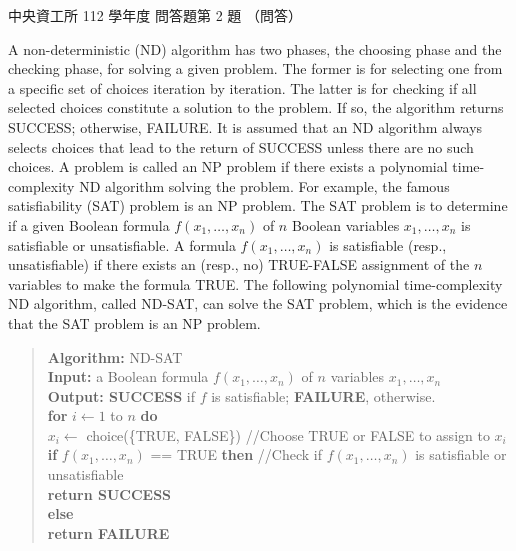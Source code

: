 \begin{pastexam}[label={px:ncu-112-dsa-12}]{中央資工所 112 學年度 問答題第 2 題}
（問答）

A non-deterministic (ND) algorithm has two phases, the choosing phase and the checking phase, for solving
a given problem. The former is for selecting one from a specific set of choices iteration by iteration.
The latter is for checking if all selected choices constitute a solution to the problem. If so, the
algorithm returns SUCCESS; otherwise, FAILURE. It is assumed that an ND algorithm always selects choices
that lead to the return of SUCCESS unless there are no such choices. A problem is called an NP problem if
there exists a polynomial time-complexity ND algorithm solving the problem. For example, the famous
satisfiability (SAT) problem is an NP problem. The SAT problem is to determine if a given Boolean formula
$f(x_1,\ldots,x_n)$ of $n$ Boolean variables $x_1,\ldots,x_n$ is satisfiable or unsatisfiable. A formula
$f(x_1,\ldots,x_n)$ is satisfiable (resp., unsatisfiable) if there exists an (resp., no) TRUE-FALSE
assignment of the $n$ variables to make the formula TRUE. The following polynomial time-complexity ND
algorithm, called ND-SAT, can solve the SAT problem, which is the evidence that the SAT problem is an NP
problem.

\begin{quote}
\textbf{Algorithm:} ND-SAT\\
\textbf{Input:} a Boolean formula $f(x_1,\ldots,x_n)$ of $n$ variables $x_1,\ldots,x_n$\\
\textbf{Output: SUCCESS} if $f$ is satisfiable; \textbf{FAILURE}, otherwise.\\
\textbf{for} $i\leftarrow 1$ to $n$ \textbf{do}\\
\hspace*{1.5em}$x_i\leftarrow$ choice(\{TRUE, FALSE\}) //Choose TRUE or FALSE to assign to $x_i$\\
\textbf{if} $f(x_1,\ldots,x_n)$ == TRUE \textbf{then} //Check if $f(x_1,\ldots,x_n)$ is satisfiable or
unsatisfiable\\
\hspace*{1.5em}\textbf{return SUCCESS}\\
\textbf{else}\\
\hspace*{1.5em}\textbf{return FAILURE}
\end{quote}


\end{pastexam}
